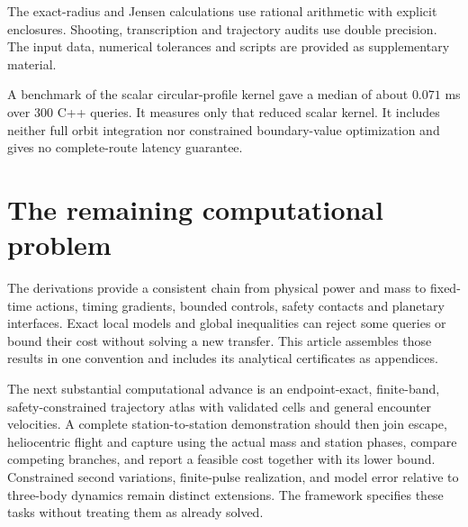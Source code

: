 The exact-radius and Jensen calculations use rational arithmetic with explicit
enclosures. Shooting, transcription and trajectory audits use double
precision. The input data, numerical tolerances and scripts are provided as
supplementary material.

A benchmark of the scalar circular-profile kernel gave a median of
about $0.071$ ms over 300 C++ queries.
It measures only that reduced scalar kernel. It includes neither
full orbit integration nor constrained boundary-value optimization
and gives no complete-route latency guarantee.

\section{The remaining computational problem}
The derivations provide a consistent chain from physical power and
mass to fixed-time actions, timing gradients, bounded controls, safety
contacts and planetary interfaces. Exact local models and global
inequalities can reject some queries or bound their cost without solving
a new transfer. This article assembles those results in one
convention and includes its analytical certificates as appendices.

The next substantial computational advance is an endpoint-exact,
finite-band, safety-constrained trajectory atlas with validated cells
and general encounter velocities. A complete station-to-station
demonstration should then join escape, heliocentric flight and capture
using the actual mass and station phases, compare competing branches,
and report a feasible cost together with its lower bound. Constrained
second variations, finite-pulse realization, and model error relative
to three-body dynamics remain distinct extensions. The framework
specifies these tasks without treating them as already solved.

